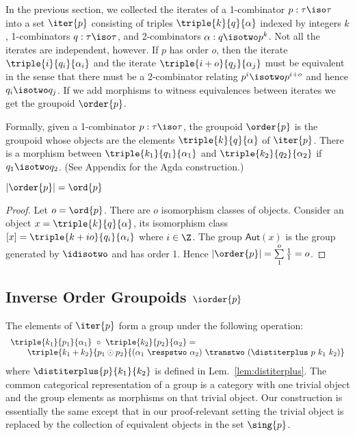 In the previous section, we collected the iterates of a 1-combinator
$p : \tau\iso\tau$ into a set $\iter{p}$ consisting of triples
$\triple{k}{q}{\alpha}$ indexed by integers $k$, 1-combinators
$q : \tau\iso\tau$, and 2-combinators $\alpha : q \isotwo p^k$. Not
all the iterates are independent, however. If $p$ has order $o$, then
the iterate $\triple{i}{q_i}{\alpha_i}$ and the iterate
$\triple{i+o}{q_j}{\alpha_j}$ must be equivalent in the sense that
there must be a 2-combinator relating $p^i \isotwo p^{i+o}$ and hence
$q_i \isotwo q_j$. If we add morphisms to witness equivalences between
iterates we get the groupoid $\order{p}$.

Formally, given a 1-combinator $p : \tau\iso\tau$, the groupoid
$\order{p}$ is the groupoid whose objects are the elements
$\triple{k}{q}{\alpha}$ of $\iter{p}$. There is a morphism between
$\triple{k_1}{q_1}{\alpha_1}$ and $\triple{k_2}{q_2}{\alpha_2}$ if
$q_1 \isotwo q_2$. (See Appendix for the Agda construction.)

\begin{lemma}
  $|\order{p}| = \ord{p}$
\end{lemma}
\begin{proof}
  Let $o = \ord{p}$. There are $o$ isomorphism classes of
  objects. Consider an object $x = \triple{k}{q}{\alpha}$, its
  isomorphism class $[x] = \triple{k+io}{q_i}{\alpha_i}$ where
  $i \in \Z$. The group $\textsf{Aut}(x)$ is the group generated by
  $\idisotwo$ and has order 1. Hence
  $|\order{p}| = \sum\limits_{1}^{o}\frac{1}{1} = o$.
\end{proof}

\subsection{Inverse Order Groupoids $\iorder{p}$}
    
The elements of $\iter{p}$ form a group under the following operation:
\[\begin{array}{l}
\triple{k_1}{p_1}{\alpha_1} ~\circ~ \triple{k_2}{p_2}{\alpha_2} = \\
\qquad  \triple{k_1+k_2}{p_1 \odot p_2}{(\alpha_1 ~\respstwo~
    \alpha_2)~\transtwo~(\distiterplus~p~k_1~k_2)}
\end{array}\]
where $\distiterplus{p}{k_1}{k_2}$ is defined in
Lem.~\ref{lem:distiterplus}. The common categorical representation of
a group is a category with one trivial object and the group elements
as morphisms on that trivial object. Our construction is essentially
the same except that in our proof-relevant setting the trivial object
is replaced by the collection of equivalent objects in the set
$\sing{p}$. 

